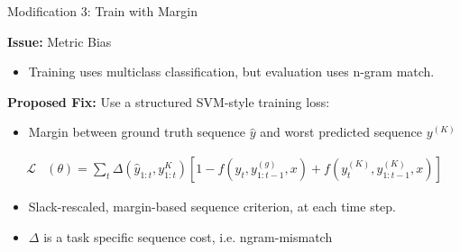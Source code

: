 \begin{frame}{Modification 3: Train with Margin}

  \textbf{Issue:} Metric Bias
    \begin{itemize}
    \item Training uses multiclass classification, but evaluation uses n-gram match.
    \end{itemize}


    \textbf{Proposed Fix:} Use a structured SVM-style training loss:
    \begin{itemize}
    \item Margin between ground truth sequence $\hat{y}$ and worst predicted sequence $y^{(K)}$
    \end{itemize}
    \begin{align*}
      \mathcal{L}&(\theta) = \sum_{t} \Delta(\hat{y}_{1:t}, y_{1:t}^{K}) \left[1 - f(\hat{y}_t, y^{(g)}_{1:t-1}, x) +  f(y_t^{(K)}, y_{1:t-1}^{(K)}, x) \right]
    \end{align*}

    \begin{itemize}
    \item Slack-rescaled, margin-based sequence criterion, at each time step.
    \item $\Delta$ is a task specific sequence cost, i.e. ngram-mismatch
    \end{itemize}

  \end{frame}


